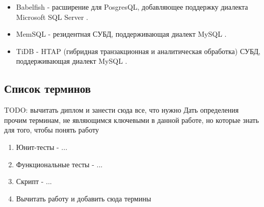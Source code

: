 \begin{itemize}
    \item Babelfish - расширение для PosgresQL, добавляющее поддержку диалекта Microsoft SQL Server \cite{babelfish}.
    \item MemSQL - резидентная СУБД, поддерживающая диалект MySQL \cite{memsql}.
    \item TiDB - HTAP (гибридная транзакционная и аналитическая обработка) СУБД, поддерживающая диалект MySQL \cite{tidb}.
\end{itemize}

\subsection{Список терминов}
TODO: вычитать диплом и занести сюда все, что нужно
Дать определения прочим терминам, не являющимся ключевыми в данной работе, но которые знать для того, чтобы понять работу
\begin{enumerate}
    \item Юнит-тесты - ...
    \item Функциональные тесты - ...
    \item Скрипт - ...
    \item Вычитать работу и добавить сюда термины
\end{enumerate}
